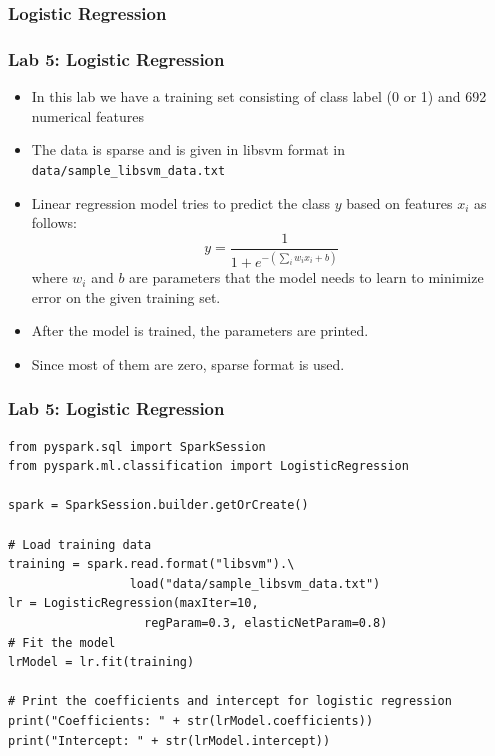 \subsubsection{Logistic Regression}
\begin{frame}[fragile]
\frametitle{Lab 5: Logistic Regression}
\begin{itemize}
\item In this lab we have a training set consisting of class label (0 or 1) and 692 numerical features
\item The data is sparse and is given in libsvm format in {\color{mycolorcli}\verb|data/sample_libsvm_data.txt|}
\item Linear regression model tries to predict the class $y$ based on features 
  $x_i$ as follows:
  \begin{equation*}
    y = \frac{1}{1 + e^{-(\sum_{i}{w_i x_i} + b)}} 
  \end{equation*}
  where $w_i$ and $b$ are parameters that the model needs to learn to minimize error on the given training set. 
  \item After the model is trained, the parameters are printed. 
  \item Since most of them are zero, sparse format is used.
\end{itemize}
\end{frame}


\begin{frame}[fragile]
\frametitle{Lab 5: Logistic Regression}
{\small
{\color{mycolorcode}
\begin{verbatim}
from pyspark.sql import SparkSession
from pyspark.ml.classification import LogisticRegression

spark = SparkSession.builder.getOrCreate()

# Load training data
training = spark.read.format("libsvm").\
                 load("data/sample_libsvm_data.txt")
lr = LogisticRegression(maxIter=10, 
                   regParam=0.3, elasticNetParam=0.8)
# Fit the model
lrModel = lr.fit(training)

# Print the coefficients and intercept for logistic regression
print("Coefficients: " + str(lrModel.coefficients))
print("Intercept: " + str(lrModel.intercept))
\end{verbatim}
}
}
\end{frame}


